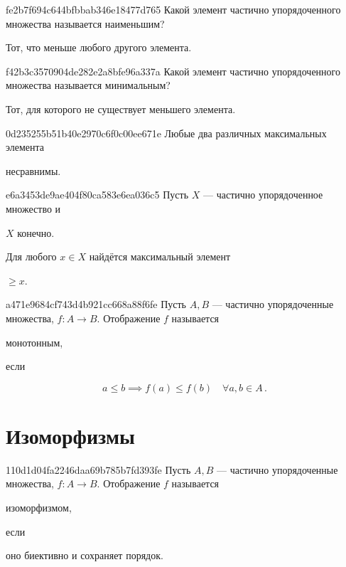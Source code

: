 \begin{note}{fe2b7f694c644bfbbab346e18477d765}
    Какой элемент частично упорядоченного множества называется наименьшим?

    \begin{cloze}{1}
        Тот, что меньше любого другого элемента.
    \end{cloze}
\end{note}

\begin{note}{f42b3c3570904de282e2a8bfe96a337a}
    Какой элемент частично упорядоченного множества называется минимальным?

    \begin{cloze}{1}
        Тот, для которого не существует меньшего элемента.
    \end{cloze}
\end{note}

\begin{note}{0d235255b51b40e2970c6f0c00ee671e}
    Любые два различных максимальных элемента \begin{icloze}{1}несравнимы.\end{icloze}
\end{note}

\begin{note}{e6a3453de9ae404f80ca583e6ea036c5}
    Пусть \({ X }\) --- частично упорядоченное множество и \begin{icloze}{2}\({ X }\) конечно.\end{icloze}
    Для любого \({ x \in X }\) найдётся максимальный элемент \begin{icloze}{1}\({ \geqslant x }\).\end{icloze}
\end{note}

\begin{note}{a471e9684cf743d4b921cc668a88f6fe}
    Пусть \({ A, B }\) --- частично упорядоченные множества, \({ f : A \to B }\).
    Отображение \({ f }\) называется \begin{icloze}{2}монотонным,\end{icloze} если
    \begin{icloze}{1}
        \[
            a \leqslant b \implies f(a) \leqslant f(b) \quad \forall a, b \in A\,.
        \]
    \end{icloze}
\end{note}

\section{Изоморфизмы}
\begin{note}{110d1d04fa2246daa69b785b7fd393fe}
    Пусть \({ A, B }\) --- частично упорядоченные множества, \({ f : A \to B }\).
    Отображение \({ f }\) называется \begin{icloze}{2}изоморфизмом,\end{icloze} если \begin{icloze}{1}оно биективно и сохраняет порядок.\end{icloze}
\end{note}

